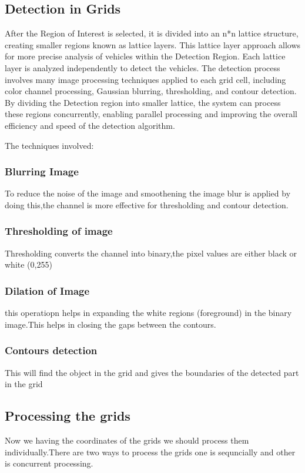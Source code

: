 \documentclass[conference]{IEEEtran}
\begin{document}
\subsection{Detection in Grids}
After the Region of Interest is selected, it is divided into an n*n lattice structure, creating smaller regions known as lattice layers. This lattice layer approach allows for more precise analysis of vehicles within the Detection Region. Each lattice layer is analyzed independently to detect the vehicles. The detection process involves many image processing techniques applied to each grid cell, including color channel processing, Gaussian blurring, thresholding, and contour detection. By dividing the Detection region into smaller lattice, the system can process these regions concurrently, enabling parallel processing and improving the overall efficiency and speed of the detection algorithm.

The techniques involved:
\subsubsection{Blurring Image}
To reduce the noise of the image and smoothening the image blur is applied by doing this,the channel is more effective for thresholding and contour detection.

\subsubsection{Thresholding of image}
Thresholding converts the channel into binary,the pixel values are either black or white (0,255)

\subsubsection{Dilation of Image}
this operatiopn helps in expanding the white regions (foreground) in the binary image.This helps in closing the gaps between the contours.

\subsubsection{Contours detection}
This will find the object in the grid and gives the boundaries of the detected part in the grid

\subsection{Processing the grids}
Now we having the coordinates of the grids we should process them individually.There are two ways to process the grids one is sequncially and other is concurrent processing.
\end{document}
